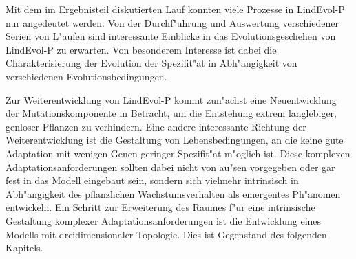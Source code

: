 Mit dem im Ergebnisteil diskutierten Lauf  konnten viele Prozesse in LindEvol-P nur angedeutet
werden. Von der Durchf"uhrung und Auswertung verschiedener Serien von L"aufen sind interessante Einblicke in das
Evolutionsgeschehen von LindEvol-P zu erwarten. Von besonderem Interesse ist dabei die Charakterisierung der Evolution
der Spezifit"at in Abh"angigkeit von verschiedenen Evolutionsbedingungen.

Zur Weiterentwicklung von LindEvol-P kommt zun"achst eine Neuentwicklung der Mutationskomponente in Betracht, um die
Entstehung extrem langlebiger, genloser Pflanzen zu verhindern. Eine andere interessante Richtung der Weiterentwicklung
ist die Gestaltung von Lebensbedingungen, an die keine gute Adaptation mit wenigen Genen geringer Spezifit"at m"oglich ist.
Diese komplexen Adaptationsanforderungen sollten dabei nicht von au"sen vorgegeben
oder gar fest in das Modell eingebaut sein, sondern sich vielmehr intrinsisch in Abh"angigkeit des
pflanzlichen Wachstumsverhalten als emergentes Ph"anomen entwickeln. Ein Schritt zur Erweiterung des Raumes
f"ur eine intrinsische Gestaltung komplexer Adaptationsanforderungen ist die Entwicklung eines Modells mit
dreidimensionaler Topologie. Dies ist Gegenstand des folgenden Kapitels.

